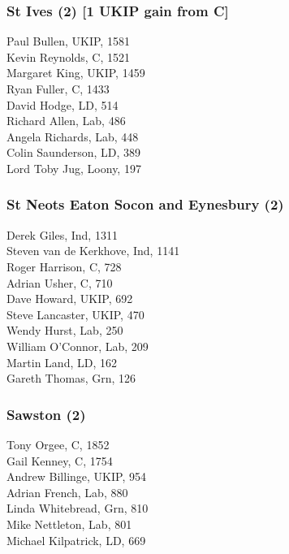 \documentclass[a4paper,openany,10pt]{book}
\begin{document}
\subsubsection*{St Ives (2) \hspace*{\fill}\nolinebreak[1]%
\enspace\hspace*{\fill}
[1 UKIP gain from C]}



Paul Bullen, UKIP, 1581\\
Kevin Reynolds, C, 1521\\
Margaret King, UKIP, 1459\\
Ryan Fuller, C, 1433\\
David Hodge, LD, 514\\
Richard Allen, Lab, 486\\
Angela Richards, Lab, 448\\
Colin Saunderson, LD, 389\\
Lord Toby Jug, Loony, 197\\


\subsubsection*{St Neots Eaton Socon and Eynesbury (2)}



Derek Giles, Ind, 1311\\
Steven van de Kerk\-hove, Ind, 1141\\
Roger Harrison, C, 728\\
Adrian Usher, C, 710\\
Dave Howard, UKIP, 692\\
Steve Lancaster, UKIP, 470\\
Wendy Hurst, Lab, 250\\
William O'Connor, Lab, 209\\
Martin Land, LD, 162\\
Gareth Thomas, Grn, 126\\


\subsubsection*{Sawston (2)}



Tony Orgee, C, 1852\\
Gail Kenney, C, 1754\\
Andrew Billinge, UKIP, 954\\
Adrian French, Lab, 880\\
Linda Whitebread, Grn, 810\\
Mike Nettleton, Lab, 801\\
Michael Kilpatrick, LD, 669\\
\end{document}
